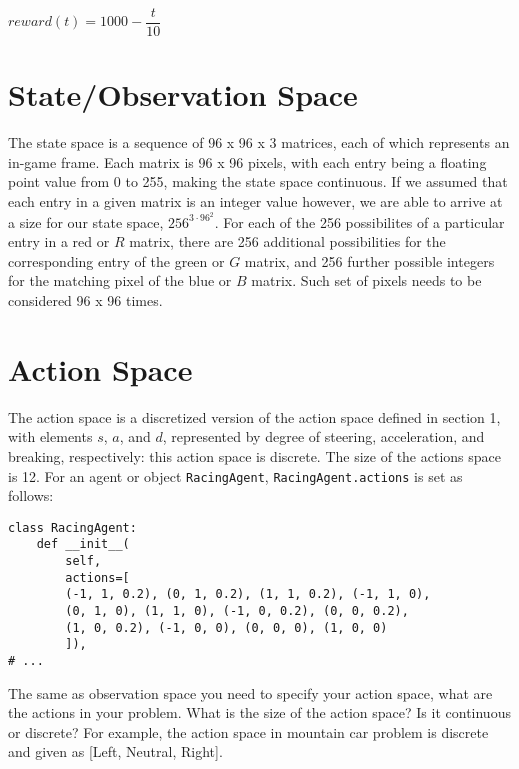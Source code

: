 \documentclass{article}
\begin{document}
\begin{center}
	$ reward(t) = 1000 - \dfrac{t}{10} $
\end{center}


\section{State/Observation Space}

The state space is a sequence of 96 x 96 x 3 matrices, each of which represents an in-game frame. Each matrix is 96 x 96 pixels, with each entry being a floating point value from 0 to 255, making the state space continuous. If we assumed that each entry in a given matrix is an integer value however, we are able to arrive at a size for our state space, $256^{3 \cdot 96^{2}}$. For each of the 256 possibilites of a particular entry in a red or $R$ matrix, there are 256 additional possibilities for the corresponding entry of the green or $G$ matrix, and 256 further possible integers for the matching pixel of the blue or $B$ matrix. Such set of pixels needs to be considered 96 x 96 times. 


\section{Action Space}

The action space is a discretized version of the action space defined in section 1, with elements $s$, $a$, and $d$, represented by degree of steering, acceleration, and breaking, respectively: this action space is discrete. The size of the actions space is 12. For an agent or object \verb|RacingAgent|, \verb|RacingAgent.actions| is set as follows:

\begin{lstlisting}
class RacingAgent:
	def __init__(
		self,
		actions=[
		(-1, 1, 0.2), (0, 1, 0.2), (1, 1, 0.2), (-1, 1, 0),
		(0, 1, 0), (1, 1, 0), (-1, 0, 0.2), (0, 0, 0.2),
		(1, 0, 0.2), (-1, 0, 0), (0, 0, 0), (1, 0, 0)
		]),
# ...
\end{lstlisting}




 


The same as observation space you need to specify your action space, what are the actions in your problem. What is the size of the action space? Is it continuous or discrete? For example, the action space in mountain car problem is discrete and given as [Left, Neutral, Right]. 
\end{document}
